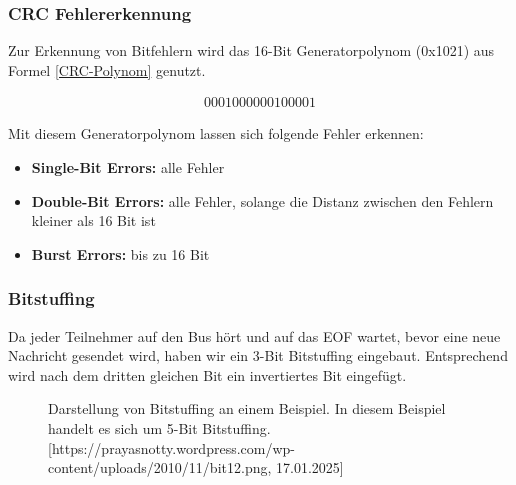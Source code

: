 \subsubsection{CRC Fehlererkennung}
Zur Erkennung von Bitfehlern wird das 16-Bit Generatorpolynom (0x1021) aus Formel \ref{CRC-Polynom} genutzt. 

\begin{align}
	0001000000100001 	\label{CRC-Polynom}
\end{align}


Mit diesem Generatorpolynom lassen sich folgende Fehler erkennen:
\begin{itemize}
	\item \textbf{Single-Bit Errors:} alle Fehler
	
	\item \textbf{Double-Bit Errors:} alle Fehler, solange die Distanz zwischen den Fehlern kleiner als 16 Bit ist
	
	\item \textbf{Burst Errors:} bis zu 16 Bit 
\end{itemize}

\subsubsection{Bitstuffing}
Da jeder Teilnehmer auf den Bus hört und auf das EOF wartet, bevor eine neue Nachricht gesendet wird, haben wir ein 3-Bit Bitstuffing eingebaut. Entsprechend wird nach dem dritten gleichen Bit ein invertiertes Bit eingefügt.

\begin{figure}[H]
	\centering    
	\caption{Darstellung von Bitstuffing an einem Beispiel. In diesem Beispiel handelt es sich um 5-Bit Bitstuffing. [https://prayasnotty.wordpress.com/wp-content/uploads/2010/11/bit12.png, 17.01.2025]}
	\label{bitstuffing}
\end{figure}